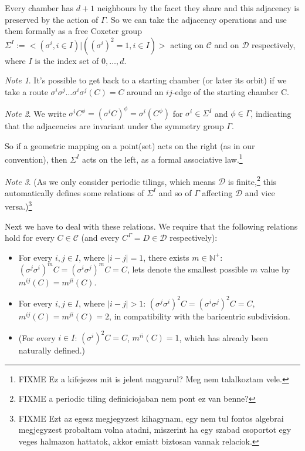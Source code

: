 \documentclass[12pt,a4paper]{article}
\theoremstyle{plain}%
\theoremstyle{definition}
\theoremstyle{remark}
\newtheorem*{note}{Note}
\begin{document}
Every chamber has $d+1$ neighbours by the facet they share and this adjacency is
preserved by the action of $\Gamma$. So we can take the adjacency operations and
use them formally as a free Coxeter group $\Sigma^I := <(\sigma^i, i\in I) |
((\sigma^i)^2=1, i\in I)>$ acting on $\mathcal{C}$ and on $\mathcal{D}$
respectively, where $I$ is the index set of $0,\ldots,d$. 

\begin{note}
  It's possible to get back to a starting chamber (or later its orbit) if we
  take a route $\sigma^i\sigma^j\ldots\sigma^i\sigma^j(C) = C$ around an
  $ij$-edge of the starting chamber C.
\end{note}

\begin{note}
  We write $\sigma^iC^\phi=(\sigma^iC)^\phi=\sigma^i(C^\phi)$ for
  $\sigma^i\in\Sigma^I$ and $\phi\in\Gamma$, indicating that the adjacencies are
  invariant under the symmetry group $\Gamma$.
  
  So if a geometric mapping on a point(set) acts on the right (as in our
  convention), then $\Sigma^I$ acts on the left, as a formal associative
  law.\footnote{FIXME Ez a kifejezes mit is jelent magyarul? Meg nem talalkoztam
  vele.}
\end{note}

\begin{note}
(As we only consider periodic tilings, which means $\mathcal{D}$ is
finite,\footnote{FIXME a periodic tiling definiciojaban nem pont ez van benne?} this
automatically defines some relations of $\Sigma^I$ and so of $\Gamma$ affecting
$\mathcal{D}$ and vice versa.)\footnote{FIXME Ezt az egesz megjegyzest
kihagynam, egy nem tul fontos algebrai megjegyzest probaltam volna atadni,
miszerint ha egy szabad csoportot egy veges halmazon hattatok, akkor emiatt biztosan
vannak relaciok.}
\end{note}

Next we have to deal with these relations. We require that the following
relations hold for every $C\in\mathcal{C}$ (and every $C^\Gamma=D\in\mathcal{D}$
respectively):
\begin{itemize}
  \item For every $i,j\in I$, where $|i-j|=1$, there exists
    $m\in\mathbb{N}^+$:
    $(\sigma^j\sigma^i)^mC=(\sigma^i\sigma^j)^mC=C$, lets denote the smallest
    possible $m$ value by $m^{ij}(C)=m^{ji}(C)$.
  \item For every $i,j\in I$, where $|i-j|>1$:
    $(\sigma^j\sigma^i)^2C=(\sigma^i\sigma^j)^2C=C$, $m^{ij}(C)=m^{ji}(C)=2$,
    in compatibility with the baricentric subdivision.  
  \item (For every $i\in I$: $(\sigma^i)^2C=C$, $m^{ii}(C)=1$, which has already
    been naturally defined.)
\end{itemize}
\end{document}
